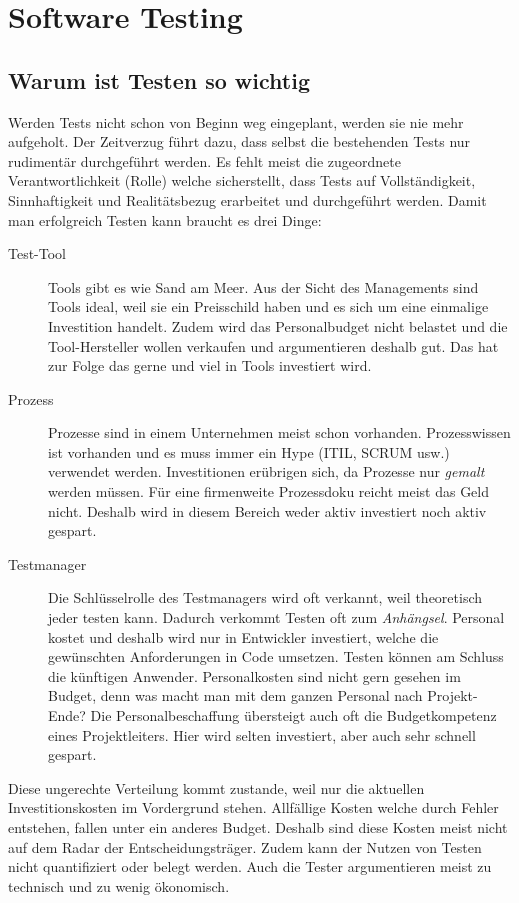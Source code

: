 \chapter{Software Testing}

\section{Warum ist Testen so wichtig}

Werden Tests nicht schon von Beginn weg eingeplant, werden sie nie mehr aufgeholt. Der Zeitverzug führt dazu, dass selbst die bestehenden Tests nur rudimentär durchgeführt werden. Es fehlt meist die zugeordnete Verantwortlichkeit (Rolle) welche sicherstellt, dass Tests auf Vollständigkeit, Sinnhaftigkeit und Realitätsbezug erarbeitet und durchgeführt werden. Damit man erfolgreich Testen kann braucht es drei Dinge:
\begin{description}
	\item[Test-Tool] Tools gibt es wie Sand am Meer. Aus der Sicht des Managements sind Tools ideal, weil sie ein Preisschild haben und es sich um eine einmalige Investition handelt. Zudem wird das Personalbudget nicht belastet und die Tool-Hersteller wollen verkaufen und argumentieren deshalb gut. Das hat zur Folge das gerne und viel in Tools investiert wird. 
	\item[Prozess] Prozesse sind in einem Unternehmen meist schon vorhanden. Prozesswissen ist vorhanden und es muss immer ein Hype (ITIL, SCRUM usw.) verwendet werden. Investitionen erübrigen sich, da Prozesse nur \textit{gemalt} werden müssen. Für eine firmenweite Prozessdoku reicht meist das Geld nicht. Deshalb wird in diesem Bereich weder aktiv investiert noch aktiv gespart.
	\item[Testmanager] Die Schlüsselrolle des Testmanagers wird oft verkannt, weil theoretisch jeder testen kann. Dadurch verkommt Testen oft zum \textit{Anhängsel}. Personal kostet und deshalb wird nur in Entwickler investiert, welche die gewünschten Anforderungen in Code umsetzen. Testen können am Schluss die künftigen Anwender. Personalkosten sind nicht gern gesehen im Budget, denn was macht man mit dem ganzen Personal nach Projekt-Ende? Die Personalbeschaffung übersteigt auch oft die Budgetkompetenz eines Projektleiters. Hier wird selten investiert, aber auch sehr schnell gespart.
\end{description}
Diese ungerechte Verteilung kommt zustande, weil nur die aktuellen Investitionskosten im Vordergrund stehen. Allfällige Kosten welche durch Fehler entstehen, fallen unter ein anderes Budget. Deshalb sind diese Kosten meist nicht auf dem Radar der Entscheidungsträger. Zudem kann der Nutzen von Testen nicht quantifiziert oder belegt werden. Auch die Tester argumentieren meist zu technisch und zu wenig ökonomisch.

